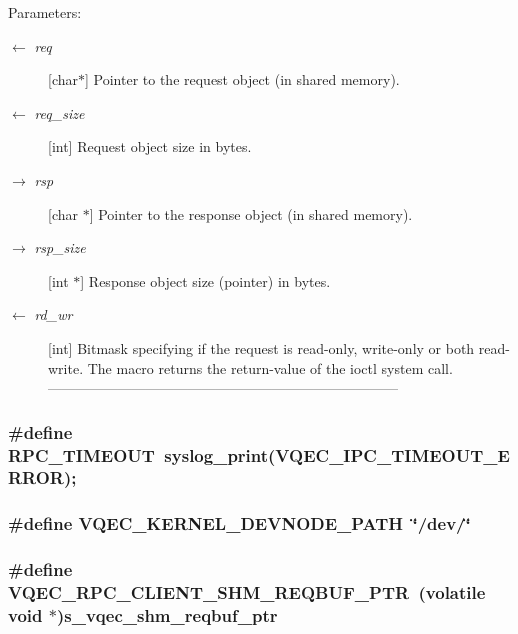 \begin{Desc}
\item[Parameters:]
\begin{description}
\item[\mbox{$\leftarrow$} {\em req}][char$\ast$] Pointer to the request object (in shared memory). \item[\mbox{$\leftarrow$} {\em req\_\-size}][int] Request object size in bytes. \item[\mbox{$\rightarrow$} {\em rsp}][char $\ast$] Pointer to the response object (in shared memory). \item[\mbox{$\rightarrow$} {\em rsp\_\-size}][int $\ast$] Response object size (pointer) in bytes. \item[\mbox{$\leftarrow$} {\em rd\_\-wr}][int] Bitmask specifying if the request is read-only, write-only or both read-write. The macro returns the return-value of the ioctl system call. --------------------------------------------------------------------------- \end{description}
\end{Desc}
\subsubsection{\setlength{\rightskip}{0pt plus 5cm}\#define RPC\_\-TIMEOUT~syslog\_\-print(VQEC\_\-IPC\_\-TIMEOUT\_\-ERROR);}\label{vqec__rpc__client_8c_59909d416fa0ec06667860117d608089}


\subsubsection{\setlength{\rightskip}{0pt plus 5cm}\#define VQEC\_\-KERNEL\_\-DEVNODE\_\-PATH~\char`\"{}/dev/\char`\"{}}\label{vqec__rpc__client_8c_79cea6e7d582391ece3524486583d61b}


\subsubsection{\setlength{\rightskip}{0pt plus 5cm}\#define VQEC\_\-RPC\_\-CLIENT\_\-SHM\_\-REQBUF\_\-PTR~(volatile void $\ast$)\bf{s\_\-vqec\_\-shm\_\-reqbuf\_\-ptr}}\label{vqec__rpc__client_8c_3203715924cc1968be729a47baee1c11}


